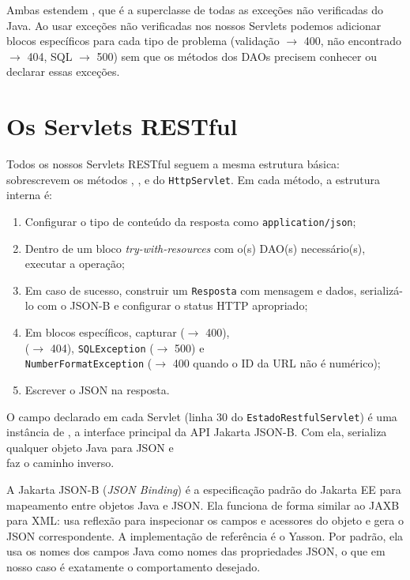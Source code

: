 Ambas estendem , que é a superclasse de todas as exceções não verificadas do Java. Ao usar exceções não verificadas nos nossos Servlets podemos adicionar blocos  específicos para cada tipo de problema (validação $\rightarrow$ 400, não encontrado $\rightarrow$ 404, SQL $\rightarrow$ 500) sem que os métodos dos DAOs precisem conhecer ou declarar essas exceções.


\section{Os Servlets RESTful}

Todos os nossos Servlets RESTful seguem a mesma estrutura básica: sobrescrevem os métodos , ,  e  do \texttt{HttpServlet}. Em cada método, a estrutura interna é:

\begin{enumerate}
    \item Configurar o tipo de conteúdo da resposta como \texttt{application/json};
    \item Dentro de um bloco \textit{try-with-resources} com o(s) DAO(s) necessário(s), executar a operação;
    \item Em caso de sucesso, construir um \texttt{Resposta} com mensagem e dados, serializá-lo com o JSON-B e configurar o status HTTP apropriado;
    \item Em blocos  específicos, capturar  ($\rightarrow$ 400),\\ ($\rightarrow$ 404), \texttt{SQLException} ($\rightarrow$ 500) e\\\texttt{NumberFormatException} ($\rightarrow$ 400 quando o ID da URL não é numérico);
    \item Escrever o JSON na resposta.
\end{enumerate}

O campo  declarado em cada Servlet (linha 30 do \texttt{EstadoRestfulServlet}) é uma instância de , a interface principal da API Jakarta JSON-B. Com ela,  serializa qualquer objeto Java para JSON e\\ faz o caminho inverso.

\begin{saibaMais}
    A Jakarta JSON-B (\textit{JSON Binding}) é a especificação padrão do Jakarta EE para mapeamento entre objetos Java e JSON. Ela funciona de forma similar ao JAXB para XML: usa reflexão para inspecionar os campos e acessores do objeto e gera o JSON correspondente. A implementação de referência é o Yasson. Por padrão, ela usa os nomes dos campos Java como nomes das propriedades JSON, o que em nosso caso é exatamente o comportamento desejado.
\end{saibaMais}


